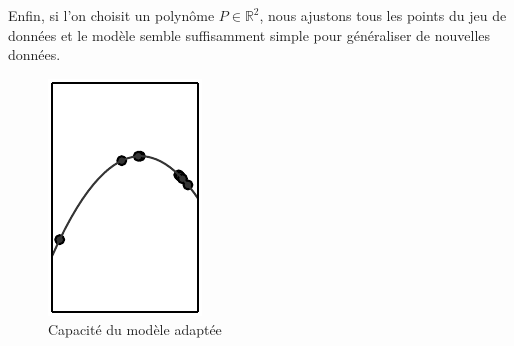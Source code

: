 \documentclass[10pt,a4paper]{report}
\begin{document}
			
			Enfin, si l'on choisit un polynôme $P \in \mathbb{R}^2$, nous ajustons tous les points du jeu de données et le modèle semble suffisamment simple pour généraliser de nouvelles données.
			\begin{figure}[H]
				\begin{center}
					\includegraphics[scale=0.5]{Images/goodfitting.png}
					\caption{Capacité du modèle adaptée}
				\end{center}
			\end{figure}
		
\end{document}

